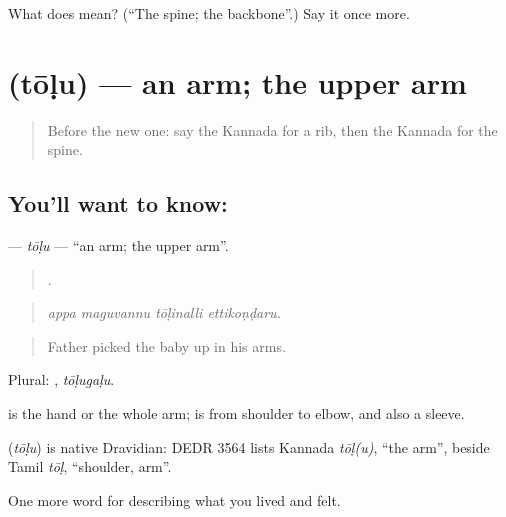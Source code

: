 \begin{tcolorbox}[breakable,colback=teal!4,colframe=teal!35!black,title={Before you move on}]
What does  mean? (\textquotedblleft{}The spine; the backbone\textquotedblright{}.) Say it once more.
\end{tcolorbox}
\section[\texorpdfstring{\kn{ತೋಳು} (tōḷu)}{ತೋಳು (tōḷu)}]{ (tōḷu) — an arm; the upper arm}

\label{lesson:KA-C509-tolu}



\begin{quote}
Before the new one: say the Kannada for a rib, then the Kannada for the spine.
\end{quote}

\subsection*{You'll want to know: }
\textbf{} — \emph{tōḷu} — \textquotedblleft{}an arm; the upper arm\textquotedblright{}.

\begin{quote}
   .
\end{quote}

\begin{quote}
\emph{appa maguvannu tōḷinalli ettikoṇḍaru.}
\end{quote}

\begin{quote}
Father picked the baby up in his arms.
\end{quote}

Plural: , \emph{tōḷugaḷu}.

 is the hand or the whole arm;  is from shoulder to elbow, and also a sleeve.

\begin{cousinweb}
\textbf{} (\emph{tōḷu}) is native Dravidian: DEDR 3564 lists Kannada \emph{tōḷ(u)}, \textquotedblleft{}the arm\textquotedblright{}, beside Tamil \emph{tōḷ}, \textquotedblleft{}shoulder, arm\textquotedblright{}.
\end{cousinweb}

\begin{grammarlens}[title={What you've built}]
One more word for describing what you lived and felt.
\end{grammarlens}

